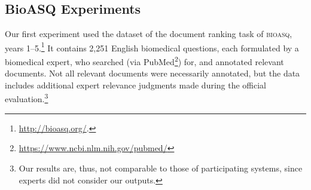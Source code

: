 \documentclass[11pt,a4paper]{article}
\newcommand{\bioasq}{\textsc{bioasq}\xspace}
\begin{document}
\subsection{BioASQ Experiments}

Our first experiment used the dataset of the document ranking task of \bioasq \cite{tsatsaronis2015overview}, years 1--5.\footnote{\url{http://bioasq.org/}.} 
It contains 2,251 English biomedical questions,
each formulated by a biomedical expert, who  searched (via PubMed\footnote{\url{https://www.ncbi.nlm.nih.gov/pubmed/}}) for, and annotated relevant documents. Not all relevant documents were necessarily annotated, but the data includes additional expert relevance judgments made during the official evaluation.\footnote{Our results are, thus, not comparable to those of participating systems, since experts did not consider our outputs.}
\end{document}
